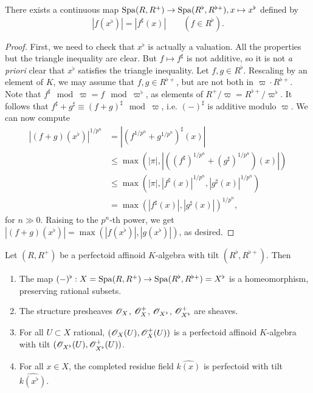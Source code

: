 \begin{proposition}
There exists a continuous map 
$\operatorname{Spa}(R,R^+) \to \operatorname{Spa}(R^\flat,R^{\flat +}), x\mapsto x^\flat$ defined by 
\[
  |f(x^\flat)| = |f^\sharp(x)| \qquad(f\in R^\flat) .
\]
\end{proposition}
\begin{proof}
First, we need to check that $x^\flat$ is actually a valuation. All the properties 
but the triangle inequality are clear. But $f\mapsto f^\sharp$ is not additive, so it 
is not \emph{a priori} clear that $x^\flat$ satisfies the triangle inequality. Let 
$f,g\in R^\flat$. Rescaling by an element of $K$, we may assume that 
$f,g\in R^{\flat +}$, but are not both in $\varpi\cdot R^{\flat +}$. Note that 
$f^\sharp\mod \varpi = f\mod\varpi^\flat$, as elements of 
$R^+/\varpi = R^{\flat+}/\varpi^\flat$. It follows that 
$f^\sharp+g^\sharp \equiv (f+g)^\sharp \mod\varpi$, i.e. $(-)^\sharp$ is additive 
modulo $\varpi$. We can now compute 
\begin{align*}
  |(f+g)(x^\flat)|^{1/p^n} &= |(f^{1/p^n}+g^{1/p^n})^\sharp(x)| \\
    &\leqslant \max(|\pi|, |((f^\sharp)^{1/p^n}+(g^\sharp)^{1/p^n})(x)|) \\
    &\leqslant \max(|\pi|, |f^\sharp(x)|^{1/p^n}, |g^\sharp(x)|^{1/p^n}) \\
    &= \max(|f^\sharp(x)|, |g^\sharp(x)|)^{1/p^n} ,
\end{align*}
for $n\gg 0$. Raising to the $p^n$-th power, we get 
$|(f+g)(x^\flat)| = \max(|f(x^\flat)|,|g(x^\flat)|)$, as desired. 
\end{proof}

\begin{theorem}
Let $(R,R^+)$ be a perfectoid affinoid $K$-algebra with tilt 
$(R^\flat,R^{\flat +})$. Then 
\begin{enumerate}
  \item The map $(-)^\flat:X=\operatorname{Spa}(R,R^+) \to \operatorname{Spa}(R^\flat,R^{\flat +})=X^\flat$ is a 
    homeomorphism, preserving rational subsets. 
  \item The structure presheaves $\mathscr{O}_X$, $\mathscr{O}_X^+$, $\mathscr{O}_{X^\flat}$, $\mathscr{O}_{X^\flat}^+$ are 
    sheaves. 
  \item For all $U\subset X$ rational, $(\mathscr{O}_X(U),\mathscr{O}_X^+(U))$ is a perfectoid 
    affinoid $K$-algebra with tilt $(\mathscr{O}_{X^\flat}(U), \mathscr{O}_{X^\flat}^+(U))$. 
  \item For all $x\in X$, the completed residue field $\widehat{k(x)}$ is 
    perfectoid with tilt $\widehat{k(x^\flat)}$. 
\end{enumerate}
\end{theorem}

